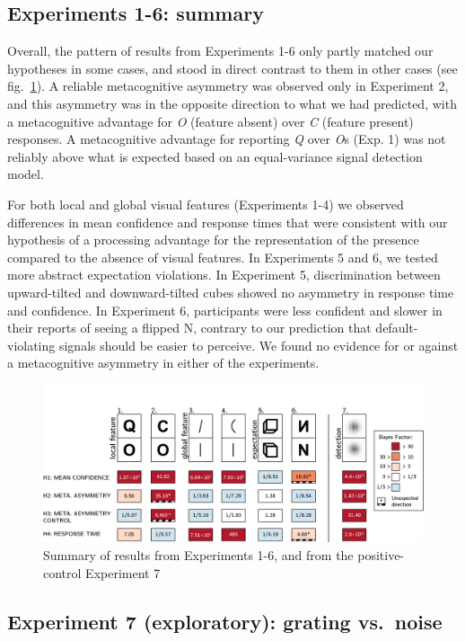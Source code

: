 \documentclass[12pt,twoside]{reedthesis}
\begin{document}
\hypertarget{asymmetry-summary}{%
\subsection{Experiments 1-6: summary}\label{asymmetry-summary}}

Overall, the pattern of results from Experiments 1-6 only partly matched our hypotheses in some cases, and stood in direct contrast to them in other cases (see fig.~\ref{fig:asymmetry-summary}). A reliable metacognitive asymmetry was observed only in Experiment 2, and this asymmetry was in the opposite direction to what we had predicted, with a metacognitive advantage for \emph{O} (feature absent) over \emph{C} (feature present) responses. A metacognitive advantage for reporting \emph{Q} over \emph{O}s (Exp. 1) was not reliably above what is expected based on an equal-variance signal detection model.

For both local and global visual features (Experiments 1-4) we observed differences in mean confidence and response times that were consistent with our hypothesis of a processing advantage for the representation of the presence compared to the absence of visual features. In Experiments 5 and 6, we tested more abstract expectation violations. In Experiment 5, discrimination between upward-tilted and downward-tilted cubes showed no asymmetry in response time and confidence. In Experiment 6, participants were less confident and slower in their reports of seeing a flipped N, contrary to our prediction that default-violating signals should be easier to perceive. We found no evidence for or against a metacognitive asymmetry in either of the experiments.
\begin{figure}
\includegraphics[width=1\linewidth]{figure/asymmetry/summary} \caption{Summary of results from Experiments 1-6, and from the positive-control Experiment 7}\label{fig:asymmetry-summary}
\end{figure}
\hypertarget{experiment-7-exploratory-grating-vs.-noise}{%
\subsection{Experiment 7 (exploratory): grating vs.~noise}\label{experiment-7-exploratory-grating-vs.-noise}}
\end{document}
